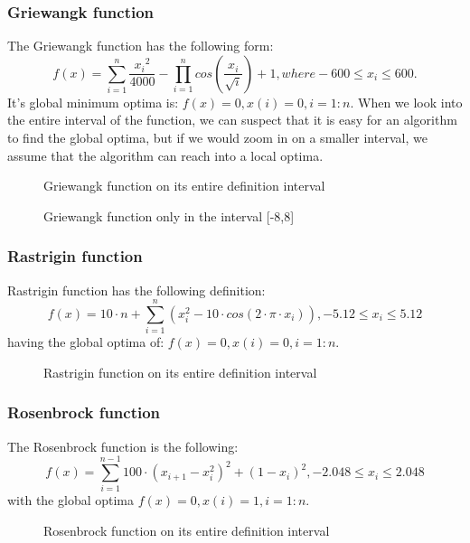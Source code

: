 \documentclass{article}
\begin{document}
\subsubsection{Griewangk function}
The Griewangk function has the following form:
$$f(x) = \sum_{i = 1}^n \frac{{x_i}^2}{4000} - \prod_{i = 1}^n cos\left(\frac{x_i}{\sqrt{i}}\right) + 1, where -600 \leq x_i \leq 600.$$
It's global minimum optima is: $f(x) = 0, x(i) = 0, i = 1:n$. When we look into the entire interval of the function, we can suspect that it is easy for an algorithm to find the global optima, but if we would zoom in on a smaller interval, we assume that the algorithm can reach into a local optima.
\begin{figure}[h!]
  \centering
  
  \caption{Griewangk function on its entire definition interval}
\end{figure}
\begin{figure}[h!]
  \centering
  
  \caption{Griewangk function only in the interval [-8,8]}
\end{figure}
\subsubsection{Rastrigin function}
Rastrigin function has the following definition:
$$f(x) = 10 \cdot n + \sum_{i=1}^n\left(x_i^2 - 10\cdot cos(2 \cdot \pi \cdot x_i)\right), -5.12 \leq x_i \leq 5.12$$
having the global optima of: $f(x) = 0, x(i) = 0, i = 1:n$. 
\begin{figure}[h!]
  \centering
  
  \caption{Rastrigin function on its entire definition interval}
\end{figure}
\subsubsection{Rosenbrock function}
The Rosenbrock function is the following:
$$f(x) = \sum_{i=1}^{n-1}100\cdot\left(x_{i+1} - x_i^2\right)^2 + \left(1 - x_i\right)^2, -2.048 \leq x_i \leq 2.048$$
with the global optima $f(x) = 0, x(i) = 1, i = 1:n$.
\begin{figure}[h!]
  \centering
  
  \caption{Rosenbrock function on its entire definition interval}
\end{figure}
\end{document}
